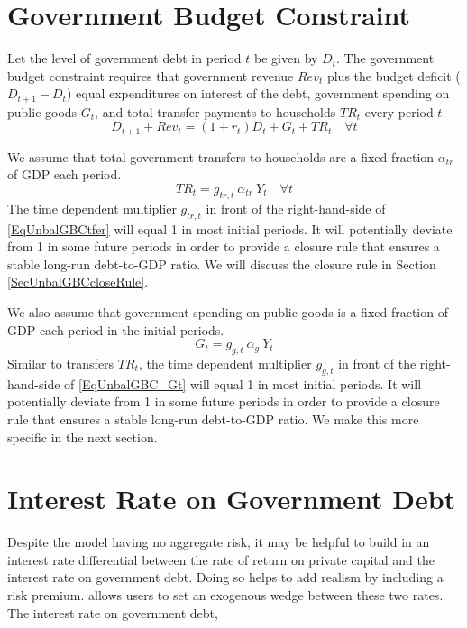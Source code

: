 \section{Government Budget Constraint}\label{SecUnbalGBCbudgConstr}

  Let the level of government debt in period $t$ be given by $D_t$. The government budget constraint requires that government revenue $Rev_t$ plus the budget deficit ($D_{t+1} - D_t$) equal expenditures on interest of the debt, government spending on public goods $G_t$, and total transfer payments to households $TR_t$ every period $t$.
  \begin{equation}\label{EqUnbalGBCbudgConstr}
    D_{t+1} + Rev_t = (1 + r_t)D_t + G_t + TR_t \quad\forall t
  \end{equation}

  We assume that total government transfers to households are a fixed fraction $\alpha_{tr}$ of GDP each period.
  \begin{equation}\label{EqUnbalGBCtfer}
    TR_t = g_{tr,t}\:\alpha_{tr}\: Y_t \quad\forall t
  \end{equation}
  The time dependent multiplier $g_{tr,t}$ in front of the right-hand-side of \eqref{EqUnbalGBCtfer} will equal 1 in most initial periods. It will potentially deviate from 1 in some future periods in order to provide a closure rule that ensures a stable long-run debt-to-GDP ratio. We will discuss the closure rule in Section \ref{SecUnbalGBCcloseRule}.

  We also assume that government spending on public goods is a fixed fraction of GDP each period in the initial periods.
  \begin{equation}\label{EqUnbalGBC_Gt}
    G_t = g_{g,t}\:\alpha_{g}\: Y_t
  \end{equation}
  Similar to transfers $TR_t$, the time dependent multiplier $g_{g,t}$ in front of the right-hand-side of \eqref{EqUnbalGBC_Gt} will equal 1 in most initial periods. It will potentially deviate from 1 in some future periods in order to provide a closure rule that ensures a stable long-run debt-to-GDP ratio. We make this more specific in the next section.


\section{Interest Rate on Government Debt}\label{SecRateWedge}

Despite the model having no aggregate risk, it may be helpful to build in an interest rate differential between the rate of return on private capital and the interest rate on government debt.  Doing so helps to add realism by including a risk premium.  \ogindia allows users to set an exogenous wedge between these two rates.  The interest rate on government debt,


